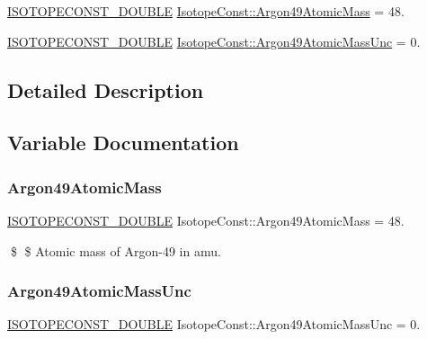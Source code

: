 \begin{DoxyCompactItemize}
\item 
\mbox{\hyperlink{group___isotope_const-_macros_ga8f45a7272ce02c0b4c65c44636ed719a}{I\+S\+O\+T\+O\+P\+E\+C\+O\+N\+S\+T\+\_\+\+D\+O\+U\+B\+LE}} \mbox{\hyperlink{group___isotope_const-_argon-_ar49_ga2c1bf15865e266e0a89e222c19f4a0dc}{Isotope\+Const\+::\+Argon49\+Atomic\+Mass}} = 48.
\item 
\mbox{\hyperlink{group___isotope_const-_macros_ga8f45a7272ce02c0b4c65c44636ed719a}{I\+S\+O\+T\+O\+P\+E\+C\+O\+N\+S\+T\+\_\+\+D\+O\+U\+B\+LE}} \mbox{\hyperlink{group___isotope_const-_argon-_ar49_gae7aa5d68c7034421b47bdb628aafef6d}{Isotope\+Const\+::\+Argon49\+Atomic\+Mass\+Unc}} = 0.
\end{DoxyCompactItemize}


\subsection{Detailed Description}


\subsection{Variable Documentation}
\mbox{\label{group___isotope_const-_argon-_ar49_ga2c1bf15865e266e0a89e222c19f4a0dc}} 
\subsubsection{\texorpdfstring{Argon49\+Atomic\+Mass}{Argon49AtomicMass}}
{\footnotesize\ttfamily \mbox{\hyperlink{group___isotope_const-_macros_ga8f45a7272ce02c0b4c65c44636ed719a}{I\+S\+O\+T\+O\+P\+E\+C\+O\+N\+S\+T\+\_\+\+D\+O\+U\+B\+LE}} Isotope\+Const\+::\+Argon49\+Atomic\+Mass = 48.}

\$ \$ Atomic mass of Argon-\/49 in amu. \mbox{\label{group___isotope_const-_argon-_ar49_gae7aa5d68c7034421b47bdb628aafef6d}} 
\subsubsection{\texorpdfstring{Argon49\+Atomic\+Mass\+Unc}{Argon49AtomicMassUnc}}
{\footnotesize\ttfamily \mbox{\hyperlink{group___isotope_const-_macros_ga8f45a7272ce02c0b4c65c44636ed719a}{I\+S\+O\+T\+O\+P\+E\+C\+O\+N\+S\+T\+\_\+\+D\+O\+U\+B\+LE}} Isotope\+Const\+::\+Argon49\+Atomic\+Mass\+Unc = 0.}

